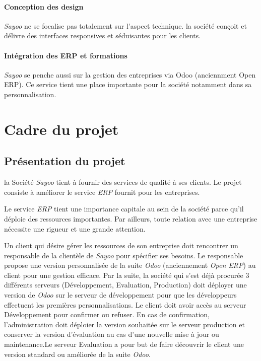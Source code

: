 \begin{onehalfspace}
\paragraph*{Conception des design}
\emph{Sayoo} ne se focalise pas totalement sur l'aspect technique. la société conçoit et délivre des interfaces responsives et séduisantes pour les clients.

\paragraph*{Intégration des ERP et formations}
\emph{Sayoo} se penche aussi sur la gestion des entreprises via Odoo (anciennment Open ERP). Ce service tient une place importante pour la société notamment dans sa personnalisation.

\section{Cadre du projet}


\subsection{Présentation du projet}
 
la Société \emph{Sayoo} tient à fournir des services de qualité à ses clients. Le projet consiste à améliorer le service \emph{ERP} fournit pour les entreprises.

Le service \emph{ERP} tient une importance capitale au sein de la société parce qu'il déploie des ressources importantes. Par ailleurs, toute relation avec une entreprise nécessite une rigueur et une grande attention.

Un client qui désire gérer les ressources de son entreprise  doit rencontrer un responsable de la clientèle de \emph{Sayoo} pour spécifier ses besoins. Le responsable propose une version personnalisée de la suite \emph{Odoo} (anciennement \emph{Open ERP}) au client pour une gestion efficace. Par la suite, la société qui s'est déjà procurée  3 différents serveurs (Développement, Evaluation, Production) doit déployer une version de \emph{Odoo} sur le serveur de développement pour que les développeurs effectuent les premières personnalisations. Le client doit avoir accès au serveur Développement pour confirmer ou refuser. En cas de confirmation, l'administration doit déploier la version souhaitée sur le serveur production et conserver la version d'évaluation au cas d'une nouvelle mise à jour ou maintenance.Le serveur Evaluation a pour but de faire découvrir le client une version standard ou améliorée de la suite \emph{Odoo}.  


\end{onehalfspace}

